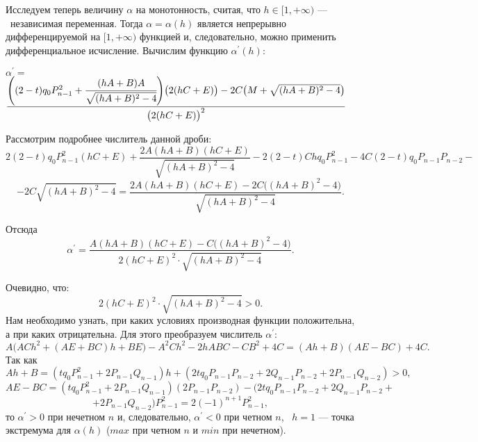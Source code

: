 Исследуем теперь величину $\alpha$ на монотонность, считая, что $h\in [1,+\infty)$ --- \ независимая переменная. Тогда $\alpha=\alpha(h)$ является непрерывно дифференцируемой на $[1,+\infty)$ функцией и, следовательно, можно применить дифференциальное исчисление.
Вычислим функцию ${\alpha}^\prime(h):$

${\alpha}^\prime=$
$\cfrac {\Biggl((2-t){q_0}{P^2_{n-1}}+\cfrac {(hA+B)A}{\sqrt {(hA+B)^{2}-4}}\Biggr)\bigl(2(hC+E)\bigr)-2C\bigl(M+\sqrt {(hA+B)^{2}-4}\bigr)}{\bigl(2(hC+E)\bigr)^{2}}$

Рассмотрим подробнее числитель данной дроби:
\[2(2-t){q_0}{P^{2}_{n-1}}(hC+E)+\frac {2A(hA+B)(hC+E)}{\sqrt{(hA+B)^{2}-4}}-2(2-t)Ch{q_0}{P^{2}_{n-1}}-4C(2-t){q_0}{P_{n-1}}{P_{n-2}}-\]
\[-2C{\sqrt{(hA+B)^{2}-4}}=\frac {2A(hA+B)(hC+E)-2C\bigl((hA+B)^{2}-4\bigr)}{\sqrt{(hA+B)^{2}-4}}.\]


Отсюда
\[{\alpha}^\prime=
\frac {A(hA+B)(hC+E)-C\bigl((hA+B)^{2}-4\bigr)}{2(hC+E)^{2}\cdot {\sqrt{(hA+B)^{2}-4}}}.\]

Очевидно, что:
\[2(hC+E)^{2}\cdot \sqrt{(hA+B)^{2}-4}>0.\]
Нам необходимо узнать, при каких условиях производная функции положительна, а при каких отрицательна. Для этого преобразуем числитель ${\alpha}^\prime$:
\[A\bigl(ACh^2+(AE+BC)h+BE\bigr)-A^{2}Ch^2-2hABC-CB^2+4C=(Ah+B)(AE-BC)+4C.\]
Так как
\[Ah+B=(t{q_0}{P^2_{n-1}}+2{P_{n-1}}{Q_{n-1}})h+(2t{q_0}{P_{n-1}}{P_{n-2}}+2{Q_{n-1}}{P_{n-2}}+2{P_{n-1}}{Q_{n-2}})>0,\] \[AE-BC=(t{q_0}{P^2_{n-1}}+2{P_{n-1}}{Q_{n-1}})(2{P_{n-1}}{P_{n-2}})-
(2t{q_0}{P_{n-1}}{P_{n-2}}+2{Q_{n-1}}{P_{n-2}}+\]
\[+2{P_{n-1}}{Q_{n-2}}){P^2_{n-1}}=2(-1)^{n+1}{P^2_{n-1}},\]
то ${\alpha}^\prime>0$ при нечетном $n$ и, следовательно, ${\alpha}^\prime<0$ при четном $n$, \ $h=1$ --- точка экстремума для $\alpha(h)$ ($max$ при четном $n$ и $min$ при нечетном).

